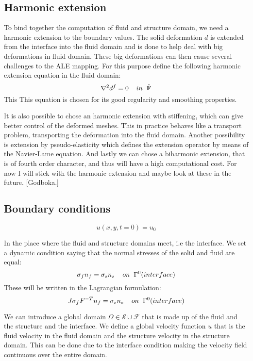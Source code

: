\subsection*{Harmonic extension}
To bind together the computation of fluid and structure domain, we need a harmonic extension to the boundary values. The solid deformation $d$ is extended from the interface into the fluid domain and is done to help deal with big deformations in fluid domain. These big deformations can then cause several challenges to the ALE mapping. 
For this purpose define the following harmonic extension equation in the fluid domain:
$$ \nabla^2 d^f = 0\hspace{4mm}in \hspace{2mm} \mathcal{\hat{F}}$$
This 
This equation is chosen for its good regularity and smoothing properties.

It is also possible to chose an harmonic extension with stiffening, which can give better control of the deformed meshes. This in practice behaves like a transport problem, transporting the deformation into the fluid domain. Another possibility is extension by pseudo-elasticity which defines the extension operator by means of the Navier-Lame equation. And lastly we can chose a biharmonic extension, that is of fourth order character, and thus will have a high computational cost. For now I will stick with the harmonic extension and maybe look at these in the future. [Godboka.]

\subsection*{Boundary conditions}
$$  u(x,y,t=0) = u_0   $$

In the place where the fluid and structure domains meet, i.e the interface. We set a dynamic condition saying that the normal stresses of the solid and fluid are equal:
$$  \sigma_f n_f = \sigma_s n_s \hspace{4mm} on  \hspace{2mm}\Gamma^0 (interface)   $$
These will be written in the Lagrangian formulation:
$$  J\sigma_f F^{-T} n_f = \sigma_s  n_s \hspace{4mm} on  \hspace{2mm}\Gamma^0 (interface)   $$

We can introduce a global domain $\Omega \in \mathcal{S} \cup \mathcal{F} $ that is made up of the fluid and the structure and the interface. We define a global velocity function $u$ that is the fluid velocity in the fluid domain and the structure velocity in the structure domain. This can be done due to the interface condition making the velocity field continuous over the entire domain.  


